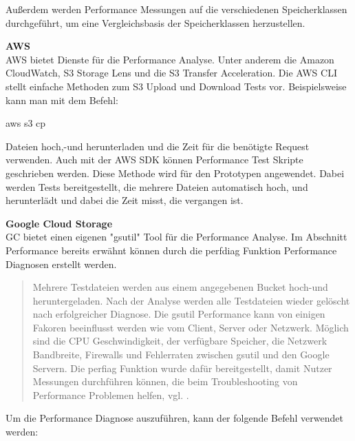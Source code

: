 Außerdem werden Performance Messungen auf die verschiedenen Speicherklassen durchgeführt, um eine Vergleichsbasis der Speicherklassen herzustellen.   

\textbf{AWS}\\

AWS bietet Dienste für die Performance Analyse. Unter anderem die Amazon CloudWatch, S3 Storage Lens und die S3 Transfer Acceleration. Die AWS CLI stellt einfache Methoden zum S3 Upload und Download Tests vor. Beispielsweise kann man mit dem Befehl:


\begin{code} aws s3 cp \end{code}

Dateien hoch,-und herunterladen und die Zeit für die benötigte Request verwenden. Auch mit der AWS SDK können Performance Test Skripte geschrieben werden. Diese Methode wird für den Prototypen angewendet. Dabei werden Tests bereitgestellt, die mehrere Dateien automatisch hoch, und herunterlädt und dabei die Zeit misst, die vergangen ist. 

\newpage

\textbf{Google Cloud Storage}\\

GC bietet einen eigenen "gsutil" Tool für die Performance Analyse. Im Abschnitt Performance bereits erwähnt können durch die perfdiag Funktion Performance Diagnosen erstellt werden. 

\begin{quote}
	Mehrere Testdateien werden aus einem angegebenen Bucket hoch-und heruntergeladen. Nach der Analyse werden alle Testdateien wieder gelöscht nach erfolgreicher Diagnose. Die gsutil Performance kann von einigen Fakoren beeinflusst werden wie vom Client, Server oder Netzwerk. Möglich sind die CPU Geschwindigkeit, der verfügbare Speicher, die Netzwerk Bandbreite, Firewalls und Fehlerraten zwischen gsutil und den Google Servern. Die perfiag Funktion wurde dafür bereitgestellt, damit Nutzer Messungen durchführen können, die beim Troubleshooting von Performance Problemen helfen, vgl. \cite{gc-perfdiag}.
\end{quote}

Um die Performance Diagnose auszuführen, kann der folgende Befehl verwendet werden:

